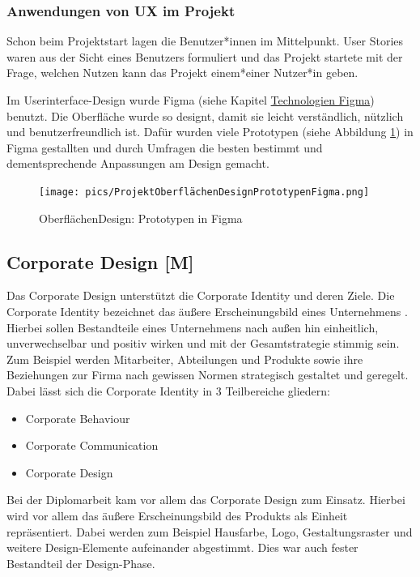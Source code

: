 \subsubsection{Anwendungen von UX im Projekt}
Schon beim Projektstart lagen die Benutzer*innen im Mittelpunkt. User Stories waren aus der Sicht eines Benutzers formuliert und das Projekt startete mit der Frage, welchen Nutzen kann das Projekt einem*einer Nutzer*in geben.

Im Userinterface-Design wurde Figma (siehe Kapitel \hyperref[ch::technologies::figma]{Technologien Figma}) benutzt. Die Oberfläche wurde so designt, damit sie leicht verständlich, nützlich und benutzerfreundlich ist. Dafür wurden viele Prototypen (siehe Abbildung \ref{fig:impl:design:prototypesfigma}) in Figma gestallten und durch Umfragen die besten bestimmt und dementsprechende Anpassungen am Design gemacht.

\begin{figure}
    \centering
    \texttt{[image: pics/ProjektOberflächenDesignPrototypenFigma.png]}
    \caption{OberflächenDesign: Prototypen in Figma}
    \label{fig:impl:design:prototypesfigma}
\end{figure}

\subsection{Corporate Design [M]}
Das Corporate Design unterstützt die Corporate Identity und deren Ziele. Die Corporate Identity bezeichnet das äußere Erscheinungsbild eines Unternehmens . Hierbei sollen Bestandteile eines Unternehmens nach außen hin einheitlich, unverwechselbar und positiv wirken und mit der Gesamtstrategie stimmig sein. Zum Beispiel werden Mitarbeiter, Abteilungen und Produkte sowie ihre Beziehungen zur Firma nach gewissen Normen strategisch gestaltet und geregelt. Dabei lässt sich die Corporate Identity in 3 Teilbereiche gliedern:

\begin{itemize}
    \item Corporate Behaviour
    \item Corporate Communication
    \item Corporate Design
\end{itemize}
\cite{CorporateIdentity}

Bei der Diplomarbeit kam vor allem das Corporate Design zum Einsatz. Hierbei wird vor allem das äußere Erscheinungsbild des Produkts als Einheit repräsentiert. Dabei werden zum Beispiel Hausfarbe, Logo, Gestaltungsraster und weitere Design-Elemente aufeinander abgestimmt. Dies war auch fester Bestandteil der Design-Phase.
\cite{CorporateDesign}

